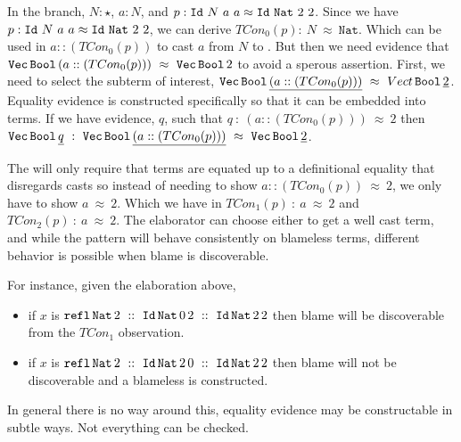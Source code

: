 In the branch, $N:\star$, $a:N$, and $p:\mathtt{Id}\ N\ a\ a\approx\mathtt{Id}\ \Nat{}\ 2\ 2$.
Since we have $p:\mathtt{Id}\ N\ a\ a\approx\mathtt{Id}\ \Nat{}\ 2\ 2$, we can derive $TCon_0(p):\ N\ \approx\ \mathtt{Nat}$.
Which can be used in $a::(TCon_0(p))$ to cast $a$ from $N$ to \Nat{}.
But then we need evidence that $\mathtt{Vec}{}\, \mathtt{Bool}{}\, (a :: (TCon_0(p)))\ \approx\ \mathtt{Vec}{}\, \mathtt{Bool}{}\, 2$ to avoid a sperous assertion.
First, we need to select the subterm of interest, $\mathtt{Vec}{}\, \mathtt{Bool}{}\, \underline{(a :: (TCon_0(p)))}\ \approx\ Vect{}\, \mathtt{Bool}{}\, \underline{2}$.
Equality evidence is constructed specifically so that it can be embedded into terms.
If we have evidence, $q$, such that $q\ :\ (a ::(TCon_0(p)))\ \approx\ 2$ then $\Vect{}\, \Bool{}\, \underline{q}\ :\ \Vect{}\, \Bool{}\, \underline{(a :: (TCon_0(p)))}\ \approx\ \Vect{}\, \Bool{}\, \underline{2}$.
 
The \csys{} will only require that terms are equated up to a definitional equality that disregards casts so instead of needing to show $a :: (TCon_0(p))\ \approx\ 2$, we only have to show $a\ \approx\ 2$.
Which we have in $TCon_1(p)\ :\ a\ \approx\ 2$ and $TCon_2(p)\ :\ a\ \approx\ 2$.
The elaborator can choose either to get a well cast term, and while the pattern will behave consistently on blameless terms, different behavior is possible when blame is discoverable.

For instance, given the elaboration above,
 
\begin{itemize}
  \item if $x$ is $\mathtt{refl}\,\Nat{}\,2\ ::\ \Id{}\,\Nat{}\,0\,2\ ::\ \Id{}\,\Nat{}\,2\,2$ then blame will be discoverable from the $TCon_1$ observation.
  \item if $x$ is $\mathtt{refl}\,\Nat{}\,2\ ::\ \Id{}\,\Nat{}\,2\,0\ ::\ \Id{}\,\Nat{}\,2\,2$ then blame will not be discoverable and a blameless \Vect{} is constructed.
\end{itemize}
In general there is no way around this, equality evidence may be constructable in subtle ways.
Not everything can be checked.


